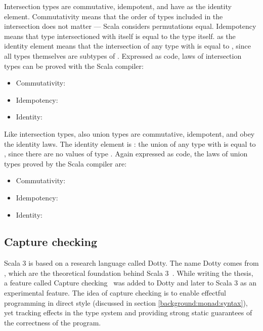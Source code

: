 Intersection types are commutative, idempotent, and have  as the identity element. Commutativity means that the order of types included in the intersection does not matter --- Scala considers permutations equal. Idempotency means that type intersectioned with itself is equal to the type itself.  as the identity element means that the intersection of any type  with  is equal to , since all types themselves are subtypes of . Expressed as code, laws of intersection types can be proved with the Scala compiler:
\begin{itemize}
    \item Commutativity: 
    \item Idempotency: 
    \item Identity: 
\end{itemize}

Like intersection types, also union types are commutative, idempotent, and obey the identity laws. The identity element is : the union of any type  with  is equal to , since there are no values of type . Again expressed as code, the laws of union types proved by the Scala compiler are:
\begin{itemize}
    \item Commutativity: 
    \item Idempotency: 
    \item Identity: 
\end{itemize}


\subsection{Capture checking}\label{scala:cc}
Scala 3 is based on a research language called Dotty. The name Dotty comes from , which are the theoretical foundation behind Scala 3~\cite{essence-of-dot}. While writing the thesis, a feature called Capture checking~\cite{capture-checking} was added to Dotty and later to Scala 3 as an experimental feature. The idea of capture checking is to enable effectful programming in direct style (discussed in section \ref{background:monad:syntax}), yet tracking effects in the type system and providing strong static guarantees of the correctness of the program.

